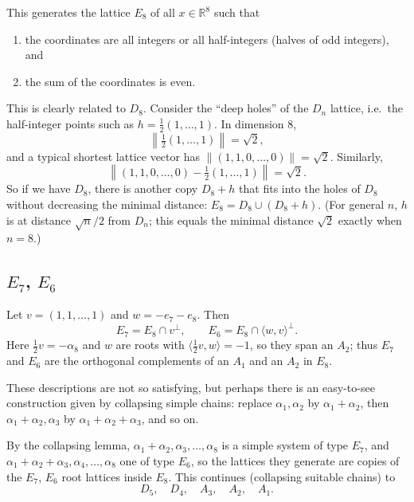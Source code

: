 \documentclass[11pt,openany]{book}
\theoremstyle{plain}
\theoremstyle{definition}
\theoremstyle{remark}
\newcommand{\added}[1]{{\color{addcol}#1}}
\newcommand{\R}{\mathbb{R}}
\newcommand{\norm}[1]{\left\lVert #1 \right\rVert}
\newcommand{\ip}[2]{\langle #1, #2\rangle}
\begin{document}
This generates the lattice $E_8$ of all $x\in\R^8$ such that
\begin{enumerate}[label=\arabic*)]
  \item the coordinates are all integers or all half-integers \added{(halves of odd integers)}, and
  \item the sum of the coordinates is even.
\end{enumerate}

This is clearly related to $D_8$. Consider the ``deep holes'' of the $D_n$ lattice, i.e.\ the
half-integer points such as $h=\frac12(1,\dots,1)$. In dimension $8$,
\[
  \norm{\tfrac12(1,\dots,1)} = \sqrt2,
\]
and a typical shortest lattice vector has $\norm{(1,1,0,\dots,0)}=\sqrt2$. Similarly,
\[
  \norm{(1,1,0,\dots,0)-\tfrac12(1,\dots,1)} = \sqrt2 .
\]
So if we have $D_8$, there is another copy $D_8+h$ that fits into the holes of $D_8$ without
decreasing the minimal distance: $E_8 = D_8\cup(D_8+h)$.
\added{(For general $n$, $h$ is at distance $\sqrt n/2$ from $D_n$; this equals the minimal
distance $\sqrt2$ exactly when $n=8$.)}

\subsection*{\texorpdfstring{$E_7$, $E_6$}{E7, E6}}
Let $v=(1,1,\dots,1)$ and $w=-e_7-e_8$. Then
\[
  E_7 = E_8\cap v^\perp,\qquad E_6 = E_8\cap \langle w,v\rangle^\perp .
\]
\added{Here $\frac12 v=-\alpha_8$ and $w$ are roots with $\ip{\tfrac12 v}{w}=-1$, so they span an
$A_2$; thus $E_7$ and $E_6$ are the orthogonal complements of an $A_1$ and an $A_2$ in $E_8$.}

These descriptions are not so satisfying, but perhaps there is an easy-to-see construction given
by collapsing simple chains: replace $\alpha_1,\alpha_2$ by $\alpha_1+\alpha_2$, then
$\alpha_1+\alpha_2,\alpha_3$ by $\alpha_1+\alpha_2+\alpha_3$, and so on.
\begin{center}
\end{center}
By the collapsing lemma, $\alpha_1+\alpha_2,\alpha_3,\dots,\alpha_8$ is a simple system of type $E_7$,
and $\alpha_1+\alpha_2+\alpha_3,\alpha_4,\dots,\alpha_8$ one of type $E_6$, \added{so the lattices they
generate are copies of the $E_7$, $E_6$ root lattices inside $E_8$.} This continues
\added{(collapsing suitable chains)} to
\[
  D_5,\quad D_4,\quad A_3,\quad A_2,\quad A_1 .
\]
\end{document}

